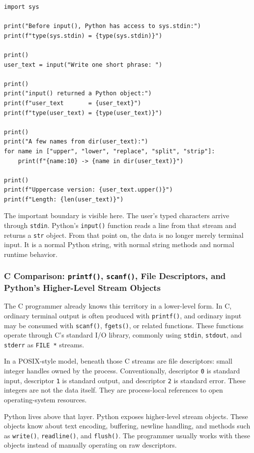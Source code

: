 \begin{verbatim}
import sys

print("Before input(), Python has access to sys.stdin:")
print(f"type(sys.stdin) = {type(sys.stdin)}")

print()
user_text = input("Write one short phrase: ")

print()
print("input() returned a Python object:")
print(f"user_text       = {user_text}")
print(f"type(user_text) = {type(user_text)}")

print()
print("A few names from dir(user_text):")
for name in ["upper", "lower", "replace", "split", "strip"]:
    print(f"{name:10} -> {name in dir(user_text)}")

print()
print(f"Uppercase version: {user_text.upper()}")
print(f"Length: {len(user_text)}")
\end{verbatim}

The important boundary is visible here. The user's typed characters arrive through \texttt{stdin}. Python's \texttt{input()} function reads a line from that stream and returns a \texttt{str} object. From that point on, the data is no longer merely terminal input. It is a normal Python string, with normal string methods and normal runtime behavior.

\subsubsection{C Comparison: \texttt{printf()}, \texttt{scanf()}, File Descriptors, and Python’s Higher-Level Stream Objects}

The C programmer already knows this territory in a lower-level form. In C, ordinary terminal output is often produced with \texttt{printf()}, and ordinary input may be consumed with \texttt{scanf()}, \texttt{fgets()}, or related functions. These functions operate through C's standard I/O library, commonly using \texttt{stdin}, \texttt{stdout}, and \texttt{stderr} as \texttt{FILE *} streams.

In a POSIX-style model, beneath those C streams are file descriptors: small integer handles owned by the process. Conventionally, descriptor \texttt{0} is standard input, descriptor \texttt{1} is standard output, and descriptor \texttt{2} is standard error. These integers are not the data itself. They are process-local references to open operating-system resources.

Python lives above that layer. Python exposes higher-level stream objects. These objects know about text encoding, buffering, newline handling, and methods such as \texttt{write()}, \texttt{readline()}, and \texttt{flush()}. The programmer usually works with these objects instead of manually operating on raw descriptors.

